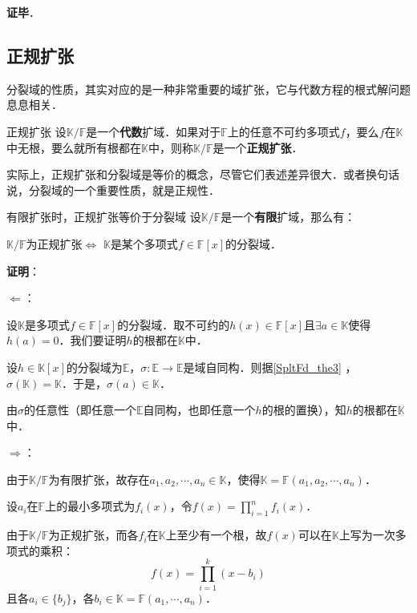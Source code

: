 \textbf{证毕}．




\subsection{正规扩张}

分裂域的性质，其实对应的是一种非常重要的域扩张，它与代数方程的根式解问题息息相关．

\begin{definition}{正规扩张}
设$\mathbb{K}/\mathbb{F}$是一个\textbf{代数}扩域．如果对于$\mathbb{F}$上的任意不可约多项式$f$，要么$f$在$\mathbb{K}$中无根，要么就所有根都在$\mathbb{K}$中，则称$\mathbb{K}/\mathbb{F}$是一个\textbf{正规扩张}．
\end{definition}

实际上，正规扩张和分裂域是等价的概念，尽管它们表述差异很大．或者换句话说，分裂域的一个重要性质，就是正规性．


\begin{theorem}{有限扩张时，正规扩张等价于分裂域}\label{SpltFd_the2}
设$\mathbb{K}/\mathbb{F}$是一个\textbf{有限}扩域，那么有：

$\mathbb{K}/\mathbb{F}$为正规扩张$\iff$ $\mathbb{K}$是某个多项式$f\in\mathbb{F}[x]$的分裂域．
\end{theorem}

\textbf{证明}：

$\Leftarrow$：

设$\mathbb{K}$是多项式$f\in\mathbb{F}[x]$的分裂域．取不可约的$h(x)\in\mathbb{F}[x]$且$\exists a\in\mathbb{K}$使得$h(a)=0$．我们要证明$h$的根都在$\mathbb{K}$中．


设$h\in\mathbb{K}[x]$的分裂域为$\mathbb{E}$，$\sigma:\mathbb{E}\to\mathbb{E}$是域自同构．则据\autoref{SpltFd_the3} ，$\sigma(\mathbb{K})=\mathbb{K}$．于是，$\sigma(a)\in\mathbb{K}$．

由$\sigma$的任意性（即任意一个$\mathbb{E}$自同构，也即任意一个$h$的根的置换），知$h$的根都在$\mathbb{K}$中．



$\Rightarrow$：

由于$\mathbb{K}/\mathbb{F}$为有限扩张，故存在$a_1, a_2, \cdots, a_n\in \mathbb{K}$，使得$\mathbb{K}=\mathbb{F}(a_1, a_2, \cdots, a_n)$．

设$a_i$在$\mathbb{F}$上的最小多项式为$f_i(x)$，令$f(x)=\prod_{i=1}^n f_i(x)$．

由于$\mathbb{K}/\mathbb{F}$为正规扩张，而各$f_i$在$\mathbb{K}$上至少有一个根，故$f(x)$可以在$\mathbb{K}$上写为一次多项式的乘积：
\begin{equation}
f(x) = \prod_{i=1}^k (x-b_i)
\end{equation}
且各$a_i\in\{b_j\}$，各$b_i\in\mathbb{K}=\mathbb{F}(a_1, \cdots, a_n)$．

